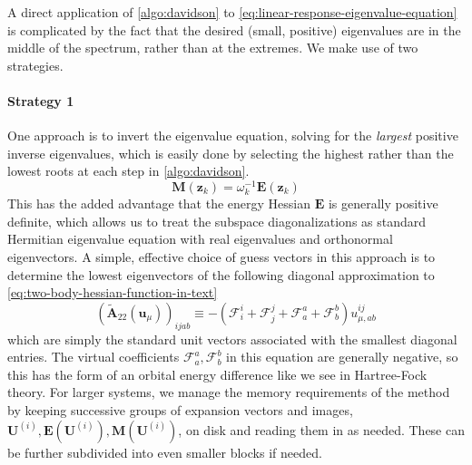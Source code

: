A direct application of \cref{algo:davidson} to
\cref{eq:linear-response-eigenvalue-equation} is complicated by the fact that
the desired (small, positive) eigenvalues are in the middle of the spectrum,
rather than at the extremes.
We make use of two strategies.

\paragraph{Strategy 1}
One approach is to invert the eigenvalue equation, solving for the {\itshape
largest} positive inverse eigenvalues, which is easily done by selecting the
highest rather than the lowest roots at each step in \cref{algo:davidson}.
\begin{equation}
    \mathbf{M}(\mathbf{z}_k)
    =
    \omega_k^{-1}
    \mathbf{E}(\mathbf{z}_k)
\end{equation}
This has the added advantage that the energy Hessian \(\mathbf{E}\) is generally
positive definite, which allows us to treat the subspace diagonalizations as
standard Hermitian eigenvalue equation with real eigenvalues and orthonormal
eigenvectors.
A simple, effective choice of guess vectors in this approach is to determine the
lowest eigenvectors of the following diagonal approximation to
\cref{eq:two-body-hessian-function-in-text}
\begin{equation}
    (\tilde{\mathbf{A}}_{22}(\mathbf{u}_{\mu}))_{ijab}
    \equiv
    -
    (
        \mathcal{F}_i^i
        +
        \mathcal{F}_j^j
        +
        \mathcal{F}_a^a
        +
        \mathcal{F}_b^b
    )
    u_{\mu,ab}^{ij}
\end{equation}
which are simply the standard unit vectors associated with the smallest diagonal
entries.
The virtual coefficients \(\mathcal{F}_a^a,\mathcal{F}_b^b\) in this equation
are generally negative, so this has the form of an orbital energy difference
like we see in Hartree-Fock theory.
For larger systems, we manage the memory requirements of the method by keeping
successive groups of expansion vectors and images,
\(
    \mathbf{U}^{(i)},
    \mathbf{E}(\mathbf{U}^{(i)}),
    \mathbf{M}(\mathbf{U}^{(i)})
\),
on disk and reading them in as needed.
These can be further subdivided into even smaller blocks if needed.


